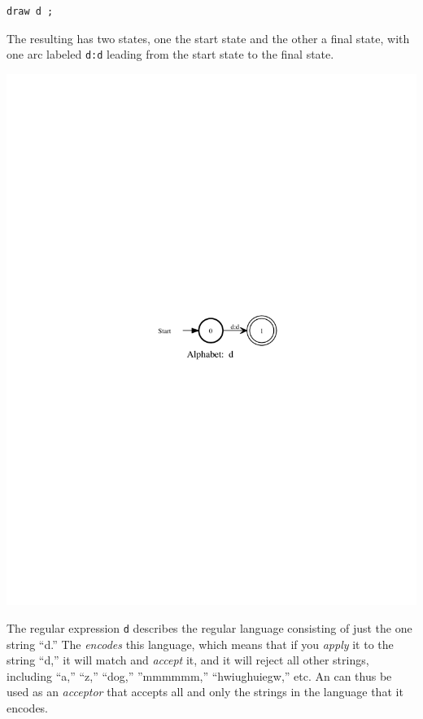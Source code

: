 \begin{Verbatim}
draw d ;
\end{Verbatim}


\noindent
The resulting \fsm{} has two states, one the start state and the other a final state,
with one arc labeled \texttt{d:d} leading from the start state to the final state.  


\begin{center}
\includegraphics{images/d.pdf}
\end{center}

\noindent
The regular expression \texttt{d} describes the regular language consisting of just the
one string ``d.''  The \fsm{} \emph{encodes} this language, which means that if you
\emph{apply} it to the string ``d,'' it will match and \emph{accept} it, and it will reject all other
strings, including ``a,'' ``z,'' ``dog,'' ''mmmmmm,'' ``hwiughuiegw,'' etc.  An \fsm{}
can thus be used as an \emph{acceptor} that accepts all and only the strings in the
language that it encodes.

